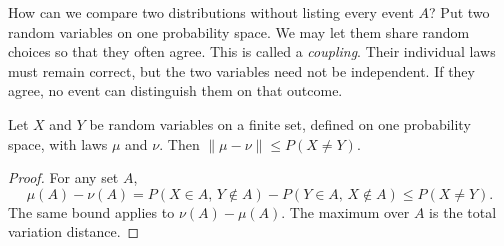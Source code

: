 How can we compare two distributions without listing every event $A$? Put two random variables on one probability space. We may let them share random choices so that they often agree. This is called a \emph{coupling}. Their individual laws must remain correct, but the two variables need not be independent. If they agree, no event can distinguish them on that outcome.

\begin{lemma}[coupling]\label{lem:coupling}
Let $X$ and $Y$ be random variables on a finite set, defined on one probability space, with laws $\mu$ and $\nu$. Then $\|\mu-\nu\|\le P(X\ne Y)$.
\end{lemma}
\begin{proof}
For any set $A$,
\[
 \mu(A)-\nu(A)=P(X\in A,\,Y\notin A)-P(Y\in A,\,X\notin A)\le P(X\ne Y).
\]
The same bound applies to $\nu(A)-\mu(A)$. The maximum over $A$ is the total variation distance.
\end{proof}

